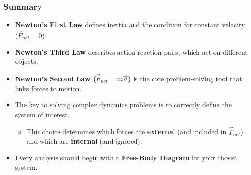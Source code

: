 \documentclass{beamer}
\begin{document}
\begin{frame}
\frametitle{Summary}
\begin{itemize}
    \item \textbf{Newton's First Law} defines inertia and the condition for constant velocity ($\vec{F}_{net}=0$). \pause
    \item \textbf{Newton's Third Law} describes action-reaction pairs, which act on different objects. \pause
    \item \textbf{Newton's Second Law ($\vec{F}_{net}=m\vec{a}$)} is the core problem-solving tool that links forces to motion. \pause
    \item The key to solving complex dynamics problems is to correctly \alert{define the system of interest}. \pause
    \begin{itemize}
        \item This choice determines which forces are \textbf{external} (and included in $\vec{F}_{net}$) and which are \textbf{internal} (and ignored).
    \end{itemize} \pause
    \item Every analysis should begin with a \textbf{Free-Body Diagram} for your chosen system.
\end{itemize}
\end{frame}
\end{document}
